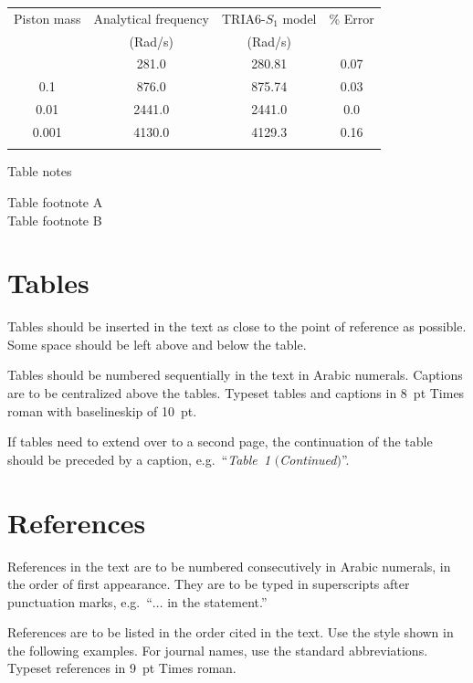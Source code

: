 \documentclass{ws-jbcb}
\begin{document}
\begin{table}[b]
{\begin{tabular}{@{}cccc@{}}
\toprule
Piston mass & Analytical frequency & TRIA6-$S_1$ model &\% Error \\
& (Rad/s) & (Rad/s) \\
\colrule
1.0\hphantom{00} & \hphantom{0}281.0 & \hphantom{0}280.81 & 0.07 \\[2pt]
0.1\hphantom{00} & \hphantom{0}876.0 & \hphantom{0}875.74 & 0.03 \\[2pt]
0.01\hphantom{0} & 2441.0 & 2441.0\hphantom{0} & 0.0\hphantom{0} \\[2pt]
0.001 & 4130.0 & 4129.3\hphantom{0} & 0.16\\
\botrule
\end{tabular}}
\begin{tabnote}
Table notes
\end{tabnote}
\begin{tabfootnote}
 Table footnote A\\
 Table footnote B
\end{tabfootnote}
\end{table}

\section{Tables}
Tables should be inserted in the text as close to the point of
reference as possible. Some space should be left above and below
the table.

Tables should be numbered sequentially in the text in Arabic
numerals. Captions are to be centralized above the tables.
Typeset tables and captions in 8~pt Times roman with
baselineskip of 10~pt.

If tables need to extend over to a second page, the continuation of
the table should be preceded by a caption, e.g.~``{\it Table~1}
$(${\it Continued}$)$''.

\section{References}
References in the text are to be numbered consecutively in
Arabic numerals, in the order of first appearance. They are to
be typed in superscripts after punctuation marks,
e.g.~``$\ldots$ in the statement.\cite{joliat}''

References are to be listed in the order cited in the text. Use
the style shown in the following examples. For journal names,
use the standard abbreviations. Typeset references in 9~pt Times
roman.
\end{document}
